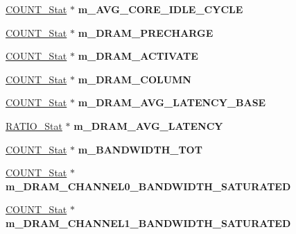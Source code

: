 \begin{DoxyCompactItemize}
\item 
\hypertarget{classall__stats__c_aaafbd77704c32e9196189db0b7250f22}{
\hyperlink{classCOUNT__Stat}{COUNT\_\-Stat} $\ast$ {\bfseries m\_\-AVG\_\-CORE\_\-IDLE\_\-CYCLE}}
\label{classall__stats__c_aaafbd77704c32e9196189db0b7250f22}

\item 
\hypertarget{classall__stats__c_a1cbab19c375a05f99d941f37208f2140}{
\hyperlink{classCOUNT__Stat}{COUNT\_\-Stat} $\ast$ {\bfseries m\_\-DRAM\_\-PRECHARGE}}
\label{classall__stats__c_a1cbab19c375a05f99d941f37208f2140}

\item 
\hypertarget{classall__stats__c_a914ca50b41aa6293b6eb7750226606c9}{
\hyperlink{classCOUNT__Stat}{COUNT\_\-Stat} $\ast$ {\bfseries m\_\-DRAM\_\-ACTIVATE}}
\label{classall__stats__c_a914ca50b41aa6293b6eb7750226606c9}

\item 
\hypertarget{classall__stats__c_aa9883ad09e34f65e9769a424edd5fefd}{
\hyperlink{classCOUNT__Stat}{COUNT\_\-Stat} $\ast$ {\bfseries m\_\-DRAM\_\-COLUMN}}
\label{classall__stats__c_aa9883ad09e34f65e9769a424edd5fefd}

\item 
\hypertarget{classall__stats__c_a780be7dc88613804831f13446e44e3c6}{
\hyperlink{classCOUNT__Stat}{COUNT\_\-Stat} $\ast$ {\bfseries m\_\-DRAM\_\-AVG\_\-LATENCY\_\-BASE}}
\label{classall__stats__c_a780be7dc88613804831f13446e44e3c6}

\item 
\hypertarget{classall__stats__c_a3e59db46246e829bf0aa3a5aa7fc1880}{
\hyperlink{classRATIO__Stat}{RATIO\_\-Stat} $\ast$ {\bfseries m\_\-DRAM\_\-AVG\_\-LATENCY}}
\label{classall__stats__c_a3e59db46246e829bf0aa3a5aa7fc1880}

\item 
\hypertarget{classall__stats__c_ae107685e5a5040838a0e740beaf73da5}{
\hyperlink{classCOUNT__Stat}{COUNT\_\-Stat} $\ast$ {\bfseries m\_\-BANDWIDTH\_\-TOT}}
\label{classall__stats__c_ae107685e5a5040838a0e740beaf73da5}

\item 
\hypertarget{classall__stats__c_abcbc23e0c4d9e62468ceefd6d2a07f87}{
\hyperlink{classCOUNT__Stat}{COUNT\_\-Stat} $\ast$ {\bfseries m\_\-DRAM\_\-CHANNEL0\_\-BANDWIDTH\_\-SATURATED}}
\label{classall__stats__c_abcbc23e0c4d9e62468ceefd6d2a07f87}

\item 
\hypertarget{classall__stats__c_aef05b8ec993051edf495ff408c111c51}{
\hyperlink{classCOUNT__Stat}{COUNT\_\-Stat} $\ast$ {\bfseries m\_\-DRAM\_\-CHANNEL1\_\-BANDWIDTH\_\-SATURATED}}
\label{classall__stats__c_aef05b8ec993051edf495ff408c111c51}


\end{DoxyCompactItemize}

